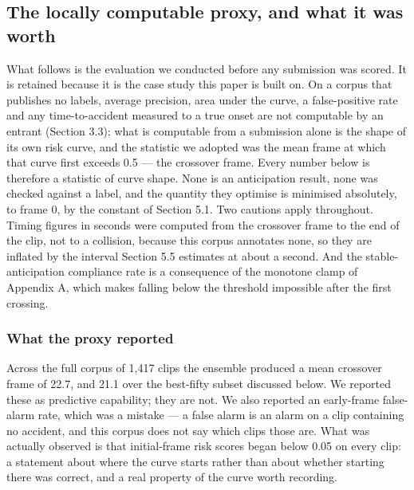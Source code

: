 \subsection{The locally computable proxy, and what it was worth}
What follows is the evaluation we conducted before any submission was scored. It is retained because it is the case study this paper is built on. On a corpus that publishes no labels, average precision, area under the curve, a false-positive rate and any time-to-accident measured to a true onset are not computable by an entrant (Section 3.3); what is computable from a submission alone is the shape of its own risk curve, and the statistic we adopted was the mean frame at which that curve first exceeds 0.5 --- the crossover frame. Every number below is therefore a statistic of curve shape. None is an anticipation result, none was checked against a label, and the quantity they optimise is minimised absolutely, to frame 0, by the constant of Section 5.1. Two cautions apply throughout. Timing figures in seconds were computed from the crossover frame to the end of the clip, not to a collision, because this corpus annotates none, so they are inflated by the interval Section 5.5 estimates at about a second. And the stable-anticipation compliance rate is a consequence of the monotone clamp of Appendix A, which makes falling below the threshold impossible after the first crossing.

\subsubsection{What the proxy reported}
Across the full corpus of 1,417 clips the ensemble produced a mean crossover frame of 22.7, and 21.1 over the best-fifty subset discussed below. We reported these as predictive capability; they are not. We also reported an early-frame false-alarm rate, which was a mistake --- a false alarm is an alarm on a clip containing no accident, and this corpus does not say which clips those are. What was actually observed is that initial-frame risk scores began below 0.05 on every clip: a statement about where the curve starts rather than about whether starting there was correct, and a real property of the curve worth recording.

